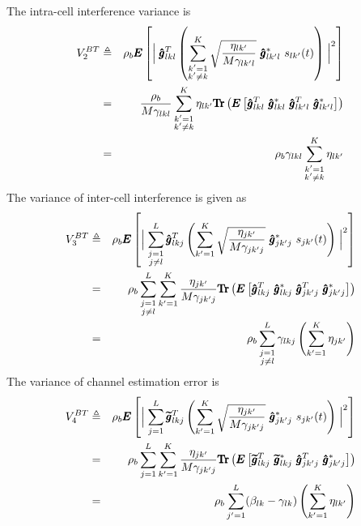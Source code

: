 \documentclass[10pt, a4paper, twoside,fleqn]{article}
\DeclareMathOperator{\Tr}{Tr}
\begin{document}
The intra-cell interference variance is
\begin{eqnarray}\label{eq:noiseF2}
	V_2^{BT} &\triangleq& \rho_b \pmb{E}\left[\Bigm| \pmb{\hat g}^T_{lkl}  \left(\sum_{\substack{k'=1 \\ k' \neq k}}^{K} \sqrt{\frac{\eta_{lk'}}{M\gamma_{lk'l}}} \ \pmb{\hat g}^*_{lk'l} \ s_{lk'} (t)\right)\Bigm|^2\right] \nonumber \\
        &=& \frac{\rho_b}{M\gamma_{lkl}} \sum_{\substack{k'=1 \\ k' \neq k}}^{K}\eta_{lk'} \pmb{\Tr}\left(\pmb{E}\left[ \pmb{\hat g}^T_{lkl} \ \pmb{\hat g}_{lkl}^* \ \pmb{\hat g}^T_{lk'l} \ \pmb{\hat g}_{lk'l}^{*} \right]\right) \nonumber \\
	    &=&  \rho_b\gamma_{lkl}\sum\limits_{\substack{k'=1\\ k'\neq k}}^{K}\eta_{lk'}
\end{eqnarray}
The variance of inter-cell interference is given as
\begin{eqnarray}\label{eq:noiseF3}
	V_3^{BT} &\triangleq& \rho_b \pmb{E}\left[\Bigm|\sum_{\substack{j=1 \\ j \neq l}}^{L} \pmb{\hat g}_{lkj}^T \left(\sum_{k'=1}^{K} \sqrt{\frac{\eta_{jk'}}{M\gamma_{jk'j}}} \ \pmb{\hat g}^*_{jk'j} \ s_{jk'} (t)\right)\Bigm|^2\right] \nonumber \\ 
    &=& \rho_b\sum_{\substack{j=1 \\ j \neq l}}^{L} \sum_{k'=1}^{K} \frac{\eta_{jk'}}{M\gamma_{jk'j}} \pmb{\Tr}\left(\pmb{E}\left[\pmb{\hat g}_{lkj}^T \ \pmb{\hat g}_{lkj}^* \ \pmb{\hat g}_{jk'j}^T \ \pmb{\hat g}_{jk'j}^{*} \right]\right) \nonumber \\
    &=& \rho_b\sum_{\substack{j=1 \\ j \neq l}}^{L}\gamma_{lkj}\left(\sum_{k'=1}^{K}\eta_{jk'}\right)
\end{eqnarray}
The variance of channel estimation error is
\begin{eqnarray}\label{eqn:noiseF4}
	V_4^{BT} &\triangleq& \rho_b \pmb{E} \left[ \Bigm |\sum_{j=1}^{L} \pmb{\widetilde{g}}_{lkj}^T \left(\sum_{k'=1}^{K} \sqrt{\frac{\eta_{jk'}}{M\gamma_{jk'j}}} \ \pmb{\hat g}^*_{jk'j} \ s_{jk'} (t)\right)\Bigm|^2 \right] \nonumber \\
     &=& \rho_b\sum_{j=1}^{L} \sum_{k'=1}^{K} \frac{\eta_{jk'}}{M\gamma_{jk'j}} \pmb{\Tr}\left(\pmb{E}\left[\pmb{\widetilde{g}}^T_{lkj} \ \pmb{\widetilde{g}}_{lkj}^* \ \pmb{\hat g}_{jk'j}^T \ \pmb{\hat g}_{jk'j}^{*} \right]\right) \nonumber \\
        &=& \rho_b\sum\limits_{j'=1}^{L}(\beta_{lk}-\gamma_{lk})\left(\sum\limits_{k'=1}^{K}\eta_{lk'}\right)
\end{eqnarray}
\end{document}
